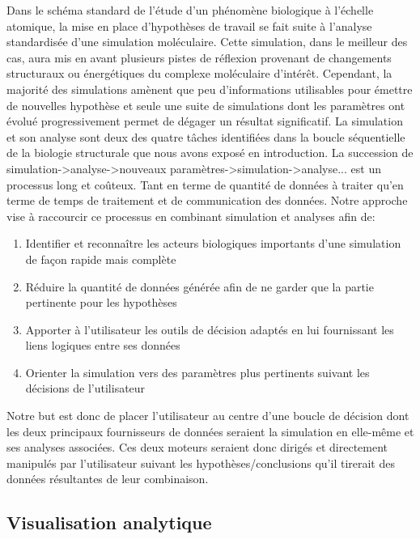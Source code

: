 Dans le schéma standard de l'étude d'un phénomène biologique à l'échelle atomique, la mise en place d'hypothèses de travail se fait suite à l'analyse standardisée d'une simulation moléculaire. Cette simulation, dans le meilleur des cas, aura mis en avant plusieurs pistes de réflexion provenant de changements structuraux ou énergétiques du complexe moléculaire d'intérêt. Cependant, la majorité des simulations amènent que peu d'informations utilisables pour émettre de nouvelles hypothèse et seule une suite de simulations dont les paramètres ont évolué progressivement permet de dégager un résultat significatif. La simulation et son analyse sont deux des quatre tâches identifiées dans la boucle séquentielle de la biologie structurale que nous avons exposé en introduction. La succession de simulation->analyse->nouveaux paramètres->simulation->analyse... est un processus long et coûteux. Tant en terme de quantité de données à traiter qu'en terme de temps de traitement et de communication des données. Notre approche vise à raccourcir ce processus en combinant simulation et analyses afin de:
\begin{enumerate}
    \item Identifier et reconnaître les acteurs biologiques importants d'une simulation de façon rapide mais complète
    \item Réduire la quantité de données générée afin de ne garder que la partie pertinente pour les hypothèses
    \item Apporter à l'utilisateur les outils de décision adaptés en lui fournissant les liens logiques entre ses données
    \item Orienter la simulation vers des paramètres plus pertinents suivant les décisions de l'utilisateur
\end{enumerate}

Notre but est donc de placer l'utilisateur au centre d'une boucle de décision dont les deux principaux fournisseurs de données seraient la simulation en elle-même et ses analyses associées. Ces deux moteurs seraient donc dirigés et directement manipulés par l'utilisateur suivant les hypothèses/conclusions qu'il tirerait des données résultantes de leur combinaison.

\subsection{Visualisation analytique}

